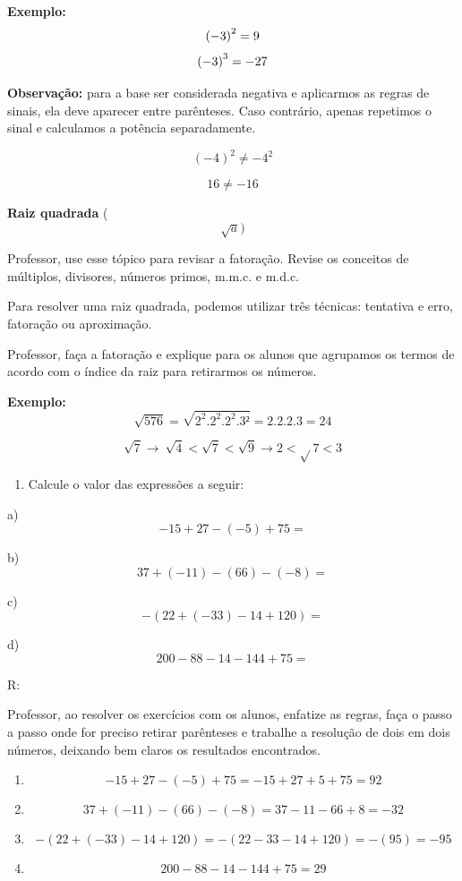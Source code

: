 \textbf{\hfill\break
Exemplo:} \[\left( - 3 \right)^{2} = 9\\\]
\[\left( - 3 \right)^{3} = -27\\\]

\textbf{Observação:} para a base ser considerada negativa e aplicarmos
as regras de sinais, ela deve aparecer entre parênteses. Caso contrário,
apenas repetimos o sinal e calculamos a potência separadamente.

\[\left( - 4 \right)^{2} \neq - 4^{2}\]

\[16 \neq - 16\]

\textbf{Raiz quadrada} (\[\sqrt{a})\]

Professor, use esse tópico para revisar a fatoração. Revise os conceitos
de múltiplos, divisores, números primos, m.m.c. e m.d.c.

Para resolver uma raiz quadrada, podemos utilizar três técnicas:
tentativa e erro, fatoração ou aproximação.

Professor, faça a fatoração e explique para os alunos que agrupamos os
termos de acordo com o índice da raiz para retirarmos os números.

\textbf{Exemplo:}
\[\text{}\sqrt{576} = \sqrt{2^{2}.2^{2}.2^{2}.3²} = 2.2.2.3 = 24\]

\[\sqrt{7} \rightarrow \ \sqrt{4} < \sqrt{7} < \sqrt{9} \rightarrow 2 < \sqrt{}7 < 3\]


\begin{enumerate}
\def\labelenumi{\arabic{enumi})}
\tightlist
\item
  Calcule o valor das expressões a seguir:
\end{enumerate}

a) \[- 15 + 27 - \left( - 5 \right) + 75 =\]

b) \[37 + \left( - 11 \right) - \left( 66 \right) - ( - 8) =\]

c) \[- (22 + \left( - 33 \right) - 14 + 120) =\]

d) \[200 - 88 - 14 - 144 + 75 =\]

R:

Professor, ao resolver os exercícios com os alunos, enfatize as regras,
faça o passo a passo onde for preciso retirar parênteses e trabalhe a
resolução de dois em dois números, deixando bem claros os resultados
encontrados.

\begin{enumerate}
\def\labelenumi{\alph{enumi})}
\item
  \[- 15 + 27 - \left( - 5 \right) + 75 = - 15 + 27 + 5 + 75 = 92\]
\item
  \[37 + \left( - 11 \right) - \left( 66 \right) - \left( - 8 \right) = 37 - 11 - 66 + 8 = - 32\]
\item
  \[- \left( 22 + \left( - 33 \right) - 14 + 120 \right) = - \left( 22 - 33 - 14 + 120 \right) = - \left( 95 \right) = - 95\]
\item
  \[200 - 88 - 14 - 144 + 75 = 29\]
\end{enumerate}

